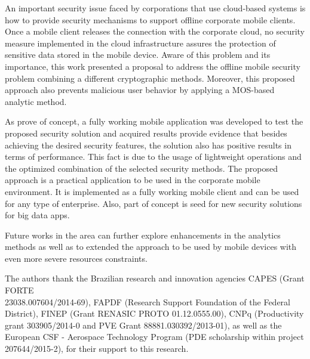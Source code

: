 \documentclass[twocolumn]{svjour3}          	%
\begin{document}
An important security issue faced by corporations that use cloud-based systems is how to provide security mechanisms to support offline corporate mobile clients. Once a mobile client releases the connection with the corporate cloud, no security measure implemented in the cloud infrastructure assures the protection of sensitive data stored in the mobile device. Aware of this problem and its importance, this work presented a proposal to address the offline mobile security problem combining a different cryptographic methods. Moreover, this proposed approach also prevents malicious user behavior by applying a MOS-based analytic method. 

As prove of concept, a fully working mobile application was developed to test the proposed security solution and acquired results provide evidence that besides achieving the desired security features, the solution also has positive results in terms of performance. This fact is due to the usage of lightweight operations and the optimized combination of the selected security methods. The proposed approach is a practical application to be used in the corporate mobile environment. It is implemented as a fully working mobile client and can be used for any type of enterprise. Also, part of concept is seed for new security solutions for big data apps. 

Future works in the area can further explore enhancements in the analytics methods as well as to extended the approach to be used by mobile devices with even more severe resources constraints.

\begin{acknowledgements}
The authors thank the Brazilian research and innovation agencies CAPES (Grant FORTE \\23038.007604/2014-69), FAPDF (Research Support Foundation of the Federal District), FINEP (Grant RENASIC PROTO 01.12.0555.00), CNPq (Productivity grant 303905/2014-0 and PVE Grant 88881.030392/2013-01), as well as the European CSF - Aerospace Technology Program (PDE scholarship within project 207644/2015-2), for their support to this research.\end{acknowledgements}

\end{document}
